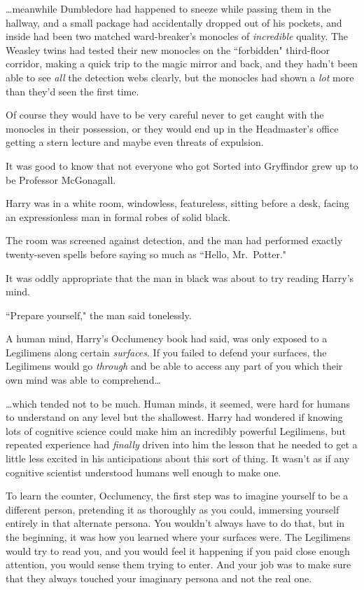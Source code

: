 {\ldots}meanwhile Dumbledore had happened to sneeze while passing them in the hallway, and a small package had accidentally dropped out of his pockets, and inside had been two matched ward-breaker's monocles of \emph{incredible} quality. The Weasley twins had tested their new monocles on the ``forbidden" third-floor corridor, making a quick trip to the magic mirror and back, and they hadn't been able to see \emph{all} the detection webs clearly, but the monocles had shown a \emph{lot} more than they'd seen the first time.

Of course they would have to be very careful never to get caught with the monocles in their possession, or they would end up in the Headmaster's office getting a stern lecture and maybe even threats of expulsion.

It was good to know that not everyone who got Sorted into Gryffindor grew up to be Professor McGonagall.

\later

Harry was in a white room, windowless, featureless, sitting before a desk, facing an expressionless man in formal robes of solid black.

The room was screened against detection, and the man had performed exactly twenty-seven spells before saying so much as ``Hello, Mr.~Potter."

It was oddly appropriate that the man in black was about to try reading Harry's mind.

``Prepare yourself," the man said tonelessly.

A human mind, Harry's Occlumency book had said, was only exposed to a Legilimens along certain \emph{surfaces}. If you failed to defend your surfaces, the Legilimens would go \emph{through} and be able to access any part of you which their own mind was able to comprehend{\ldots}

{\ldots}which tended not to be much. Human minds, it seemed, were hard for humans to understand on any level but the shallowest. Harry had wondered if knowing lots of cognitive science could make him an incredibly powerful Legilimens, but repeated experience had \emph{finally} driven into him the lesson that he needed to get a little less excited in his anticipations about this sort of thing. It wasn't as if any cognitive scientist understood humans well enough to make one.

To learn the counter, Occlumency, the first step was to imagine yourself to be a different person, pretending it as thoroughly as you could, immersing yourself entirely in that alternate persona. You wouldn't always have to do that, but in the beginning, it was how you learned where your surfaces were. The Legilimens would try to read you, and you would feel it happening if you paid close enough attention, you would sense them trying to enter. And your job was to make sure that they always touched your imaginary persona and not the real one.

